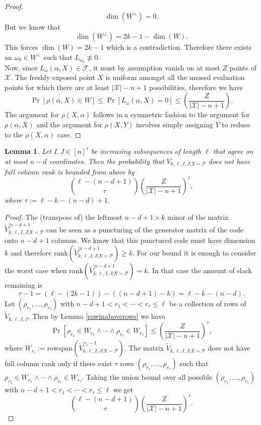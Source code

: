 \documentclass[draft, onecolumn, 11pt]{IEEEtran}
\newtheorem{lemma}[theorem]{Lemma}
\begin{document}
\begin{proof}
    $$\dim(W^\bot) = 0.$$  
    But we know that
    $$\dim(W^\bot) = 2k-1 - \dim(W).$$
    This forces $\dim(W) = 2k-1$ which is a contradiction. Therefore there exists an $\omega_0 \in W^\bot$ such that $L_{\omega_0} \not\equiv 0$. 
    \\
    Now, since $L_\omega(\alpha, X) \in \mathcal{F}$, it must by assumption vanish on at most $Z$ points of $\mathcal{X}$. The freshly exposed point $X$ is uniform amongst all the unused evaluation points for which there are at least $|\mathcal{X}| - n + 1$ possibilities, therefore we have 
    $$\Pr[\rho(\alpha,X) \in W] \leq \Pr[L_\omega(\alpha, X) = 0] \leq \left(\frac{Z}{|\mathcal{X}| - n + 1}\right).$$
    The argument for $\rho(X, \alpha)$ follows in a symmetric fashion to the argument for $\rho(\alpha, X)$ and the argument for $\rho(X,Y)$ involves simply assigning $Y$ to reduce to the $\rho(X, \alpha)$ case. 
\end{proof}

\begin{lemma} \label{Probnotfullrank}
    Let $I,J \in [n]^\ell$ be increasing subsequences of length $\ell$ that agree on at most $n-d$ coordinates. Then the probability that $V_{k, \ell, I, J|X=\mathcal{P}}$ does not have full column rank is bounded from above by 
    $$\binom{\ell - (n - d + 1)}{\tau} \left(\frac{Z}{|\mathcal{X}| - n + 1}\right)^\tau , $$
    where $\tau  := \ell - k - (n - d) + 1$.
\end{lemma}
\begin{proof}
    The (transpose of) the leftmost $n - d + 1 \times k$ minor of the matrix $\widetilde{V}_{k, \ell, I, J|X = \mathcal{P}}^{|n-d + 1}$ can be seen as a puncturing of the generator matrix of the code onto $n - d + 1$ columns. We know that this punctured code must have dimension $k$ and therefore $\mathrm{rank}(\widetilde{V}_{k, \ell, I, J|X = \mathcal{P}}^{|n-d + 1}) \geq k$. For our bound it is enough to consider the worst case when $\mathrm{rank}(\widetilde{V}_{k, \ell, I, J|X = \mathcal{P}}^{|n-d + 1}) = k$. 
    In that case the amount of slack remaining is $$\tau - 1 = (\ell - (2k-1)) - ((n-d+1)- k) = \ell - k - (n-d).$$
    Let $(\rho_{r_1}, \dots, \rho_{r_\tau})$ with $n - d + 1 < r_1 < \cdots < r_\tau \leq \ell$ be a collection of rows of $\widetilde{V}_{k,\ell, I, J}$. Then by Lemma \ref{rowinaboverows} we have $$\Pr[\rho_{r_1} \in W_{r_1}\land \cdots \land \rho_{r_\tau} \in W_{r_\tau}] \leq \left(\frac{Z}{|\mathcal{X}| - n + 1}\right)^\tau,$$
    where $W_{r_i} := \mathrm{rowspan}(\widetilde{V}_{k,\ell,I,J|X = \mathcal{P}}^{|r_i - 1})$. The matrix $\widetilde{V}_{k, \ell, I, J|X=\mathcal{P}}$ does not have full column rank only if there exist $\tau$ rows $(\rho_{r_1}, \dots, \rho_{r_\tau})$ such that $\rho_{r_1} \in W_{r_1}\land \cdots \land \rho_{r_\tau} \in W_{r_\tau}$. Taking the union bound over all possible $(\rho_{r_1}, \dots, \rho_{r_\tau})$ with $n - d + 1 < r_1 < \cdots < r_\tau \leq \ell$ we get 
    $$\binom{\ell - (n - d + 1)}{\tau} \left(\frac{Z}{|\mathcal{X}| - n + 1}\right)^\tau.$$
\end{proof}
\end{document}
